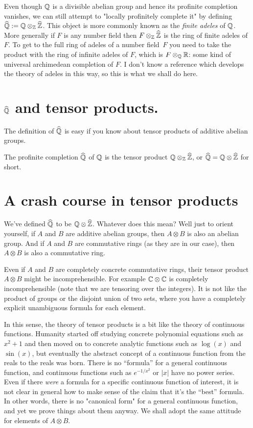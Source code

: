 Even though $\mathbb{Q}$ is a divisible abelian group and hence its profinite completion vanishes,
we can still attempt to "locally profinitely complete it" by defining $\widehat{\mathbb{Q}}:=\mathbb{Q}\otimes_{\mathbb{Z}}\widehat{\mathbb{Z}}$.
This object is more commonly known as the \emph{finite adeles} of $\mathbb{Q}$. More generally if $F$ is
any number field then $F\otimes_{\mathbb{Z}}\widehat{\mathbb{Z}}$ is the ring of finite adeles of $F$. To get to
the full ring of adeles of a number field~$F$ you need to take the product with the
ring of infinite adeles of $F$, which is $F\otimes_{\mathbb{Q}}\mathbb{R}$: some kind of universal
archimedean completion of $F$. I don't know a reference which develops the theory of adeles
in this way, so this is what we shall do here.

\section{\texorpdfstring{$\widehat{\mathbb{Q}}$}{Qhat} and tensor products.}

The definition of $\widehat{\mathbb{Q}}$ is easy if you know about tensor products
of additive abelian groups.

\begin{definition}
    \label{QHat}
    \leanok
    The profinite completion $\widehat{\mathbb{Q}}$ of $\mathbb{Q}$ is the tensor product $\mathbb{Q}\otimes_{\mathbb{Z}}\widehat{\mathbb{Z}}$,
    or $\widehat{\mathbb{Q}}=\mathbb{Q}\otimes\widehat{\mathbb{Z}}$ for short.
\end{definition}

\section{A crash course in tensor products}

We've defined $\widehat{\mathbb{Q}}$ to be $\mathbb{Q}\otimes\widehat{\mathbb{Z}}$. Whatever does this mean? Well just to orient yourself,
if $A$ and $B$ are additive abelian groups, then $A\otimes B$ is also an abelian group.
And if $A$ and $B$ are commutative rings (as they are in our case), then $A\otimes B$ is also
a commutative ring.

Even if $A$ and $B$ are completely concrete commutative rings, their tensor product $A\otimes B$
might be incomprehensible. For example $\mathbb{C}\otimes\mathbb{C}$ is completely incomprehensible (note that we are
tensoring over the integers). It is not like the product of groups or the disjoint union of
two sets, where you have a completely explicit unambiguous formula for each element.

In this sense, the theory of tensor products is a bit like the theory of continuous functions.
Humanity started off studying concrete polynomial equations such as $x^2+1$ and then moved on to
concrete analytic functions such as $\log(x)$ and $\sin(x)$, but eventually the abstract concept
of a continuous function from the reals to the reals was born. There is no ``formula'' for a general
continuous function, and continuous functions such as $e^{-1/x^2}$ or $|x|$ have no power series.
Even if there \emph{were} a formula for a specific continuous function of interest, it is not clear
in general how to make sense of the claim that it's the ``best'' formula. In other words, there is
no "canonical form" for a general continuous function, and yet we prove things about them anyway.
We shall adopt the same attitude for elements of $A\otimes B$.

